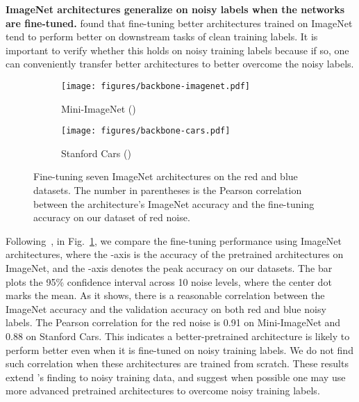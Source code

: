 \documentclass{article}
\begin{document}
\textbf{ImageNet architectures generalize on noisy labels when the networks are fine-tuned.} \citet{kornblith2019better} found that fine-tuning better architectures trained on ImageNet tend to perform better on downstream tasks of clean training labels. It is important to verify whether this holds on noisy training labels because if so, one can conveniently transfer better architectures to better overcome the noisy labels.
\begin{figure}[ht]
\vspace{-1mm}
\centering
\begin{subfigure}[b]{0.35\textwidth}
    \texttt{[image: figures/backbone-imagenet.pdf]}
    \vspace{-5mm}
    \caption{Mini-ImageNet ()}
\end{subfigure}
\begin{subfigure}[b]{0.35\textwidth}
    \texttt{[image: figures/backbone-cars.pdf]}
    \vspace{-5mm}
    \caption{Stanford Cars ()}
    \vspace{-3mm}
\end{subfigure}
\vspace{-2mm}
\caption{\label{fig:backbones}Fine-tuning seven ImageNet architectures on the red and blue datasets. The number in parentheses is the Pearson correlation between the architecture's ImageNet accuracy and the fine-tuning accuracy on our dataset of red noise.}
\vspace{-3mm}
\end{figure}

Following~\citep{kornblith2019better}, in Fig.~\ref{fig:backbones}, we compare the fine-tuning performance using ImageNet architectures, where the -axis is the accuracy of the pretrained architectures on ImageNet, and the -axis denotes the peak accuracy on our datasets. The bar plots the 95\% confidence interval across 10 noise levels, where the center dot marks the mean. As it shows, there is a reasonable correlation between the ImageNet accuracy and the validation accuracy on both red and blue noisy labels. The Pearson correlation for the red noise is 0.91 on Mini-ImageNet and 0.88 on Stanford Cars. This indicates a better-pretrained architecture is likely to perform better even when it is fine-tuned on noisy training labels. We do not find such correlation when these architectures are trained from scratch. These results extend \citet{kornblith2019better}'s finding to noisy training data, and suggest when possible one may use more advanced pretrained architectures to overcome noisy training labels.
\end{document}
